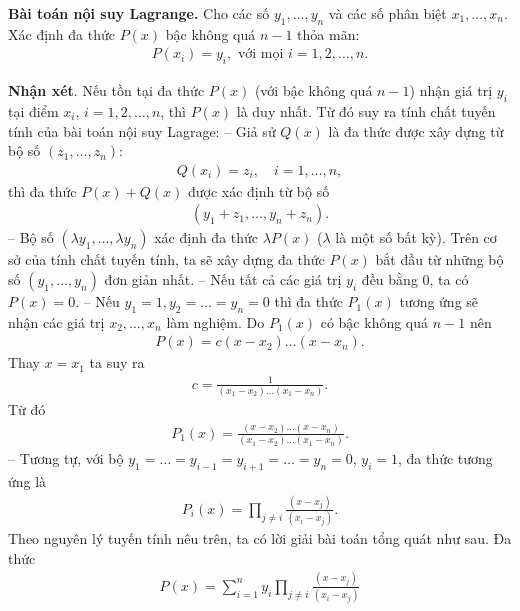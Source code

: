 \begin{multicols}{2}
	\begin{tBox}
		\textbf{\color{hoccungpi}Bài toán nội suy Lagrange.}
		Cho các số $y_1,\ldots, y_n$ và các số phân biệt $x_1,\ldots,x_n$. Xác định đa thức $P(x)$ bậc không quá $n-1$ thỏa mãn:
		\begin{align*}
			P(x_i)=y_i, \text{ với mọi } i=1,2,\ldots, n.
		\end{align*}
	\end{tBox}
	\textbf{\color{hoccungpi}Nhận xét}.
	Nếu tồn tại đa thức $P(x)$ (với bậc không quá $n-1$) nhận giá trị $y_i$ tại điểm $x_i$, 
	$i=1,2,\ldots, n$, thì $P(x)$ là duy nhất. 
	Từ đó suy ra { tính chất tuyến tính} của bài toán nội suy Lagrage:
	\vskip 0.1cm
	-- Giả sử $Q(x)$ là đa thức được xây dựng từ bộ số $(z_1,\ldots, z_n):$
	\begin{align*}
		Q(x_i)=z_i,\quad i=1,\ldots,n,
	\end{align*}
	thì đa thức $P(x)+Q(x)$ được xác định từ bộ số
	\begin{align*}
		(y_1+z_1,\ldots,y_n+z_n).
	\end{align*}
	-- Bộ số $(\lambda y_1,\ldots,\lambda y_n)$ xác định đa thức $\lambda P(x)$ ($\lambda$ là một số bất kỳ).  
	\vskip 0.1cm
	{Trên cơ sở của tính chất tuyến tính, ta sẽ xây dựng đa thức $P(x)$ bắt đầu từ những bộ số $(y_1,\ldots,y_n)$ đơn giản nhất.} 
	\vskip 0.1cm
	-- Nếu tất cả các giá trị $y_i$ đều bằng $0$, ta có $P(x)=0$.
	\vskip 0.1cm  
	-- Nếu $y_1=1, y_2=\ldots=y_n=0$ thì đa thức $P_1(x)$ tương ứng sẽ nhận các giá trị  $x_2,\ldots,x_n$ làm nghiệm. Do $P_1(x)$ có bậc không quá $n-1$ nên  
	\begin{align*}
		P(x)=c(x-x_2)\ldots(x-x_n).
	\end{align*}
	Thay $x=x_1$ ta suy ra
	\begin{align*}
		c=\frac1{(x_1-x_2)\ldots(x_1-x_n)}.
	\end{align*}
	Từ đó
	\begin{align*}
		P_1(x)=\frac{ (x-x_2)\ldots(x-x_n)}{
			(x_1-x_2)\ldots(x_1-x_n)}.
	\end{align*}
	-- Tương tự, với bộ $y_1=\ldots=y_{i-1}=y_{i+1}=\ldots=y_n=0$, $y_i=1$,  đa thức tương ứng là 
	\begin{align*}
		P_i(x) =\prod_{j\neq i}\frac{(x-x_j)}{ (x_i-x_j)}.
	\end{align*}
	Theo nguyên lý tuyến tính nêu trên, ta có lời giải bài toán tổng quát như sau. Đa thức  
	\begin{align*}
		P(x)=\sum_{i=1}^n y_i\prod_{j\neq i}\frac{(x-x_j)}{ (x_i-x_j)} \tag{$1$}
	\end{align*}

\end{multicols}
